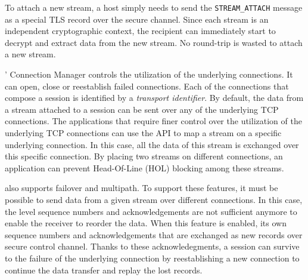 To attach a new stream, a host simply needs to send the \texttt{STREAM\_ATTACH} message as a special TLS record over the secure channel. Since each stream is an independent cryptographic context, the recipient can immediately start to decrypt and extract data from the new stream. No round-trip is wasted to attach a new stream.




\tcpls' Connection Manager controls the utilization of the underlying \tcp connections. It can open, close or reestablish failed \tcp connections. Each of
the connections that compose a \tcpls session is identified by a \emph{transport identifier}. By default, the data from a stream attached to a \tcpls session can be sent over any of the underlying TCP connections. The applications that
require finer control over the utilization of the underlying TCP connections can
use the \tcpls API to map a stream on a specific underlying connection. In this case, all the data of this stream is exchanged over this specific connection.
By placing two streams on different connections, an application can prevent Head-Of-Line (HOL) blocking among these streams.

\tcpls also supports failover and multipath. To support these features, it
must be possible to send data from a given stream over different \tcp connections. In this case, the \tcp level sequence numbers and acknowledgements are not sufficient anymore to enable the receiver to reorder the data. When this feature
is enabled, \tcpls its own sequence numbers and acknowledgements that are exchanged as new \tls records over secure control channel.
Thanks to these \tcpls acknowledegments, a \tcpls session can survive to
the failure of the underlying \tcp connection by reestablishing a new
\tcp connection to continue the data transfer and replay the lost records.

